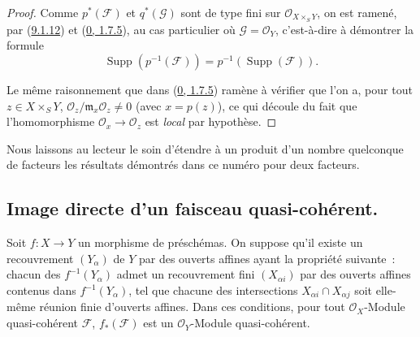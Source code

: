 \begin{proof}
Comme $p^*(\mathscr{F})$ et $q^*(\mathscr{G})$ sont de type fini sur
$\mathscr{O}_{X\times_S Y}$, on est ramené, par
(\hyperref[I.9.1.12-fr]{9.1.12}) et
(\hyperref[0.1.7.5-fr]{0, 1.7.5}), au cas particulier où
$\mathscr{G}=\mathscr{O}_Y$, c'est-à-dire à démontrer la formule
\[
  \operatorname{Supp}(p^{-1}(\mathscr{F}))
  =p^{-1}(\operatorname{Supp}(\mathscr{F})).
  \tag{9.1.13.1}\label{I.9.1.13.1-fr}
\]

Le même raisonnement que dans (\hyperref[0.1.7.5-fr]{0, 1.7.5}) ramène à
vérifier que l'on a, pour tout $z\in X\times_S Y$,
$\mathscr{O}_z/\mathfrak{m}_x\mathscr{O}_z\neq0$ (avec $x=p(z)$), ce qui
découle du fait que l'homomorphisme
$\mathscr{O}_x\to\mathscr{O}_z$ est \emph{local} par hypothèse.
\end{proof}

Nous laissons au lecteur le soin d'étendre à un produit d'un nombre
quelconque de facteurs les résultats démontrés dans ce numéro pour deux
facteurs.

\subsection{Image directe d'un faisceau quasi-cohérent.}
\label{subsection:I.9.2-fr}

\begin{proposition}[9.2.1]
\label{I.9.2.1-fr}
Soit $f:X\to Y$ un morphisme de préschémas. On suppose qu'il existe un
recouvrement $(Y_\alpha)$ de $Y$ par des ouverts affines ayant la propriété
suivante~: chacun des $f^{-1}(Y_\alpha)$ admet un recouvrement fini
$(X_{\alpha i})$ par des ouverts affines contenus dans
$f^{-1}(Y_\alpha)$, tel que chacune des intersections
$X_{\alpha i}\cap X_{\alpha j}$ soit elle-même réunion finie d'ouverts
affines. Dans ces conditions, pour tout $\mathscr{O}_X$-Module
quasi-cohérent $\mathscr{F}$, $f_*(\mathscr{F})$ est un
$\mathscr{O}_Y$-Module quasi-cohérent.
\end{proposition}

